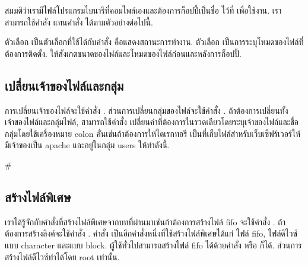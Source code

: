 \begin{thwbr}
สมมติว่าเรามีไฟล์โปรแกรมไบนารีที่คอมไพล์เองและต้องการก็อปปี้เป็นชื่อ  ไว้ที่  เพื่อใช้งาน. เราสามารถใช้คำสั่ง  แทนคำสั่ง  ได้ตามตัวอย่างต่อไปนี้.
\begin{MyExample}\label{ex:install}
\end{MyExample}%
ตัวเลือก  เป็นตัวเลือกที่ใช้ได้กับคำสั่ง  คือแสดงสถานะการทำงาน. ตัวเลือก  เป็นการระบุโหมดของไฟล์ที่ต้องการติดตั้ง. ให้สังเกตขนาดของไฟล์และโหมดของไฟล์ก่อนและหลังการก็อปปี้.


\subsection{เปลี่ยนเจ้าของไฟล์และกลุ่ม}
การเปลี่ยนเจ้าของไฟล์จะใช้คำสั่ง . ส่วนการเปลี่ยนกลุ่มของไฟล์จะใช้คำสั่ง . ถ้าต้องการเปลี่ยนทั้งเจ้าของไฟล์และกลุ่มไฟล์, สามารถใช้คำสั่ง  เปลี่ยนค่าที่ต้องการในรวดเดียวโดยระบุเจ้าของไฟล์และชื่อกลุ่มโดยใช้เครื่องหมาย colon คั่นเช่นถ้าต้องการให้ไดเรกทอรี  เป็นที่เก็บไฟล์สำหรับเว็บเซิฟร์เวอร์ให้มีเจ้าของเป็น apache และอยู่ในกลุ่ม users ให้ทำดังนี้.
\begin{MyExample}
\begin{MyEx}
# 
\end{MyEx}
\end{MyExample}

\subsection{สร้างไฟล์พิเศษ}
เราได้รู้จักกับคำสั่งที่สร้างไฟล์พิเศษจากบทที่ผ่านมาเช่นถ้าต้องการสร้างไฟล์ fifo จะใช้คำสั่ง . ถ้าต้องการสร้างลิงค์จะใช้คำสั่ง . คำสั่ง  เป็นอีกคำสั่งหนึ่งที่ใช้สร้างไฟล์พิเศษได้แก่ ไฟล์ fifo, ไฟล์ดีไวซ์แบบ character และแบบ block. ผู้ใช้ทั่วไปสามารถสร้างไฟล์ fifo ได้ด้วยคำสั่ง  หรือ  ก็ได้. ส่วนการสร้างไฟล์ดีไวซ์ทำได้โดย root เท่านั้น. 


\end{thwbr}
